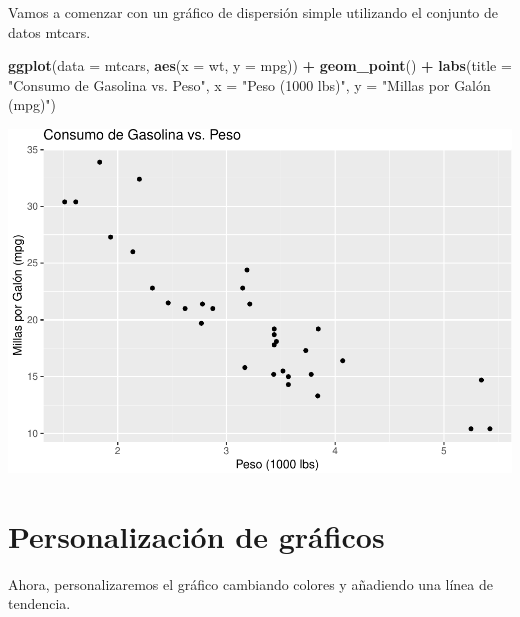 \documentclass[
]{book}
\newenvironment{Shaded}{\begin{snugshade}}{\end{snugshade}}
\newcommand{\AttributeTok}[1]{\textcolor[rgb]{0.13,0.29,0.53}{#1}}
\newcommand{\FunctionTok}[1]{\textcolor[rgb]{0.13,0.29,0.53}{\textbf{#1}}}
\newcommand{\NormalTok}[1]{#1}
\newcommand{\SpecialCharTok}[1]{\textcolor[rgb]{0.81,0.36,0.00}{\textbf{#1}}}
\newcommand{\StringTok}[1]{\textcolor[rgb]{0.31,0.60,0.02}{#1}}
\begin{document}
Vamos a comenzar con un gráfico de dispersión simple utilizando el conjunto de datos mtcars.

\begin{Shaded}
\begin{Highlighting}[]
\FunctionTok{ggplot}\NormalTok{(}\AttributeTok{data =}\NormalTok{ mtcars, }\FunctionTok{aes}\NormalTok{(}\AttributeTok{x =}\NormalTok{ wt, }\AttributeTok{y =}\NormalTok{ mpg)) }\SpecialCharTok{+} 
  \FunctionTok{geom\_point}\NormalTok{() }\SpecialCharTok{+}
  \FunctionTok{labs}\NormalTok{(}\AttributeTok{title =} \StringTok{"Consumo de Gasolina vs. Peso"}\NormalTok{,}
       \AttributeTok{x =} \StringTok{"Peso (1000 lbs)"}\NormalTok{,}
       \AttributeTok{y =} \StringTok{"Millas por Galón (mpg)"}\NormalTok{)}
\end{Highlighting}
\end{Shaded}

\includegraphics{bookdown-demo_files/figure-latex/unnamed-chunk-170-1.pdf}

\hypertarget{personalizaciuxf3n-de-gruxe1ficos}{%
\section{Personalización de gráficos}\label{personalizaciuxf3n-de-gruxe1ficos}}

Ahora, personalizaremos el gráfico cambiando colores y añadiendo una línea de tendencia.
\end{document}

